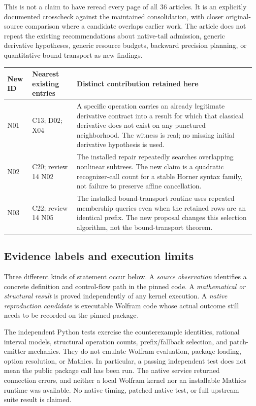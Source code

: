 \documentclass[11pt,a4paper]{article}
\newcommand{\code}[1]{\texttt{\detokenize{#1}}}
\begin{document}
This is not a claim to have reread every page of all 36 articles. It is an
explicitly documented crosscheck against the maintained consolidation, with
closer original-source comparison where a candidate overlaps earlier work.
The article does not repeat the existing recommendations about native-tail
admission, generic derivative hypotheses, generic resource budgets, backward
precision planning, or quantitative-bound transport as new findings.

\begin{longtable}{@{}L{12mm}L{44mm}L{\dimexpr\textwidth-56mm-4\tabcolsep\relax}@{}}
\toprule New ID & Nearest existing entries & Distinct contribution retained here\\\midrule\endhead
N01 & C13; D02; X04 & A specific \code{Abs} operation carries an already legitimate derivative contract into a result for which that classical derivative does not exist on any punctured neighborhood. The witness is real; no missing initial derivative hypothesis is used.\\
N02 & C20; review 14 N02 & The installed repair repeatedly searches overlapping nonlinear subtrees. The new claim is a quadratic recognizer-call count for a stable Horner syntax family, not failure to preserve affine cancellation.\\
N03 & C22; review 14 N05 & The installed bound-transport routine uses repeated membership queries even when the retained rows are an identical prefix. The new proposal changes this selection algorithm, not the bound-transport theorem.\\
\bottomrule
\end{longtable}

\subsection{Evidence labels and execution limits}
Three different kinds of statement occur below. A \emph{source observation}
identifies a concrete definition and control-flow path in the pinned code. A
\emph{mathematical or structural result} is proved independently of any kernel
execution. A \emph{native reproduction candidate} is executable Wolfram code
whose actual outcome still needs to be recorded on the pinned package.

The independent Python tests exercise the counterexample identities, rational
interval models, structural operation counts, prefix/fallback selection, and
patch-emitter mechanics. They do not emulate Wolfram evaluation, package loading,
option resolution, or Mathics. In particular, a passing independent test does not
mean the public package call has been run. The native service returned connection
errors, and neither a local Wolfram kernel nor an installable Mathics runtime was
available. No native timing, patched native test, or full upstream suite result is
claimed.
\end{document}

